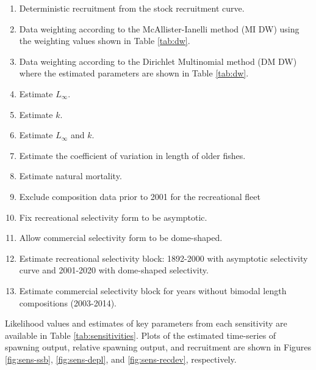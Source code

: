 \documentclass[11pt,
  english,
  a4paper,
]{article}
\begin{document}
\leavevmode\tagmcend\tagstructend\par

\begin{enumerate}
   
  \item Deterministic recruitment from the stock recruitment curve. 

  \item Data weighting according to the McAllister-Ianelli method (MI DW) using the weighting values shown in Table \ref{tab:dw}. 
  
  \item Data weighting according to the Dirichlet Multinomial method (DM DW) where the estimated parameters are shown in Table \ref{tab:dw}. 

  \item Estimate $L_{\infty}$.
  
  \item Estimate $k$.
  
  \item Estimate $L_{\infty}$ and $k$.

  \item Estimate the coefficient of variation in length of older fishes.

  \item Estimate natural mortality.
  
  \item Exclude composition data prior to 2001 for the recreational fleet

  \item Fix recreational selectivity form to be asymptotic. 
  
  \item Allow commercial selectivity form to be dome-shaped.

  \item Estimate recreational selectivity block: 1892-2000 with asymptotic selectivity curve and 2001-2020 with dome-shaped selectivity.   
  
  \item Estimate commercial selectivity block for years without bimodal length compositions (2003-2014). 
  
\end{enumerate}


Likelihood values and estimates of key parameters from each sensitivity are available in Table \ref{tab:sensitivities}. Plots of the estimated time-series of spawning output, relative spawning output, and recruitment are shown in Figures \ref{fig:sens-ssb}, \ref{fig:sens-depl}, and \ref{fig:sens-recdev}, respectively.
\end{document}

